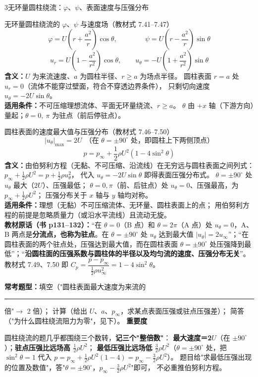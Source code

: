 \begin{kaodian}{3}{无环量圆柱绕流：$\varphi$、$\psi$、表面速度与压强分布}
\begin{gongshi}{无环量圆柱绕流的 $\varphi$、$\psi$ 与速度场（教材式 7.41--7.47）}
\[ \varphi=U\left(r+\frac{a^2}{r}\right)\cos\theta,\qquad\qquad
   \psi=U\left(r-\frac{a^2}{r}\right)\sin\theta \]
\[ u_r=U\left(1-\frac{a^2}{r^2}\right)\cos\theta,\qquad
   u_\theta=-U\left(1+\frac{a^2}{r^2}\right)\sin\theta \]
\textbf{含义：}$U$ 为来流速度、$a$ 为圆柱半径、$r\ge a$ 为场点半径。
圆柱表面 $r=a$ 处 $u_r=0$（流体不能穿过壁面，符合不穿透边界条件），
只剩切向速度 $u_\theta=-2U\sin\theta$。\\
\textbf{适用条件：}不可压缩理想流体、平面无环量绕流、$r\ge a$。
$\theta$ 由 $+x$ 轴（下游方向）量起；$\theta=0,\ \pi$ 为驻点（前后停驻点）。
\end{gongshi}

\begin{gongshi}{圆柱表面的速度最大值与压强分布（教材式 7.46--7.50）}
\[ |u_{\theta}|_{\max}=2U\ \ \text{（在 }\theta=\pm90^\circ\text{ 处，即圆柱上下两侧顶点）} \]
\[ p=p_\infty+\frac12\rho U^2\left(1-4\sin^2\theta\right) \]
\textbf{含义：}由伯努利方程（无黏、不可压缩、沿流线）在无穷远与圆柱表面之间列式：
$p_\infty+\frac12\rho U^2=p+\frac12\rho u_\theta^2$，
代入 $u_\theta=-2U\sin\theta$ 即得表面压强分布式。
$\theta=\pm90^\circ$ 处 $u_\theta$ 最大（$2U$）、压强最低；
$\theta=0,\pi$（前、后驻点）处 $u_\theta=0$、压强最高，为 $p_\infty+\frac12\rho U^2$；
压强分布关于 $x$ 轴与 $y$ 轴均对称。\\
\textbf{适用条件：}理想（无黏）不可压缩流体、无环量、圆柱表面上的点；
用伯努利方程的前提是忽略质量力（或沿水平流线）且流动无旋。\\
\textbf{教材原话（书 p131--132）：}“在 $\theta=0$（B 点）和 $\theta=2\pi$（A 点）处 $u_\theta=0$，A、B 两点是\textbf{分流点，也称为驻点}。在 $\theta=\pm90^\circ$ 处 $u_\theta$ 达到最大值 $|u_\theta|=2u_\infty$”；“在圆柱表面的两个驻点处，压强达到最大值，而在圆柱表面 $\theta=\pm90^\circ$ 处压强降到最低”；“\textbf{沿圆柱面的压强系数与圆柱体的半径以及均匀流的速度、压强分布无关}”。教材式 7.49、7.50 即 $C_p=\dfrac{p-p_\infty}{\frac12\rho u_\infty^2}=1-4\sin^2\theta$。
\end{gongshi}

\textbf{常考题型：}填空（"圆柱表面最大速度为来流的\rule{1.2cm}{0.4pt}倍"$\to$ 2 倍）；
计算（给出 $U$、$a$、$p_\infty$，求某点表面压强或驻点压强差）；
简答（"为什么圆柱绕流阻力为零"，见下）。
\textbf{重要度 }\quad{}\quad{}

\begin{banfa}
圆柱绕流的题几乎都围绕三个数转，\textbf{记三个"整倍数"}：
\textbf{最大速度＝2$U$}（在 $\pm90^\circ$）；\textbf{驻点压强比远场高 $\frac12\rho U^2$}；
\textbf{最低压强比远场低 $\frac32\rho U^2$}（$\theta=\pm90^\circ$ 处，把 $\sin^2\theta=1$ 代入
$p=p_\infty+\frac12\rho U^2(1-4)=p_\infty-\frac32\rho U^2$）。
题目给"求最低压强出现的位置及数值"，答"$\theta=\pm90^\circ$，$p_\infty-\frac32\rho U^2$"即可，
不必重推伯努利方程。
\end{banfa}
\end{kaodian}

